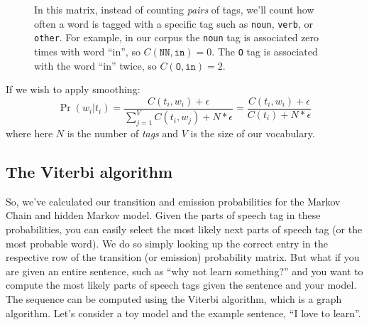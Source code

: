 \documentclass[12pt]{article}
\begin{document}
\begin{figure}[h]
  \begin{center}
  \caption{In this matrix, instead of counting \emph{pairs} of tags, we'll count how often a word is tagged with a specific tag such as \texttt{noun}, \texttt{verb}, or \texttt{other}. For example, in our corpus the \texttt{noun} tag is associated zero times with word ``in'', so $C(\texttt{NN}, \texttt{in}) = 0$. The \texttt{O} tag is associated with the word ``in'' twice, so $C(\texttt{O}, \texttt{in}) = 2$.}
\end{center}
\end{figure}

If we wish to apply smoothing:
\[
  \Pr(w_i | t_i) = \frac{C(t_i, w_i) + \epsilon}{\sum_{j=1}^V C(t_i, w_j) + N * \epsilon} = \frac{C(t_i, w_i) + \epsilon}{C(t_i) + N * \epsilon}
\]
where here $N$ is the number of \emph{tags} and $V$ is the size of our vocabulary.

\subsection{The Viterbi algorithm} So, we've calculated our transition and emission probabilities for the Markov Chain and hidden Markov model. Given the parts of speech tag in these probabilities, you can easily select the most likely next parts of speech tag (or the most probable word). We do so simply looking up the correct entry in the respective row of the transition (or emission) probability matrix. But what if you are given an entire sentence, such as ``why not learn something?'' and you want to compute the most likely parts of speech tags given the sentence and your model. The sequence can be computed using the Viterbi algorithm, which is a graph algorithm. Let's consider a toy model and the example sentence, ``I love to learn''.
\end{document}
